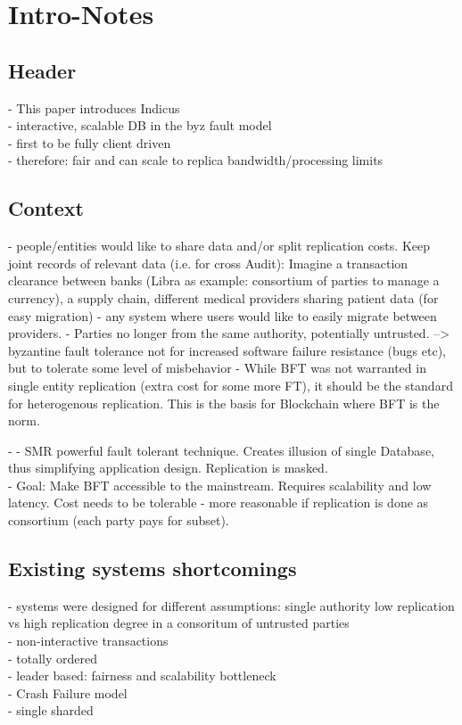 \section{Intro-Notes}

\subsection{Header}

 - This paper introduces Indicus\\
 - interactive, scalable DB in the byz fault model\\
 - first to be fully client driven\\
 - therefore: fair and can scale to replica bandwidth/processing limits
 
 \subsection{Context}
 - people/entities would like to share data and/or split replication costs. Keep joint records of relevant data (i.e. for cross Audit): Imagine a transaction clearance between banks  (Libra as example: consortium of parties to manage a currency), a supply chain, different medical providers sharing patient data (for easy migration) - any system where users would like to easily migrate between providers.
 - Parties no longer from the same authority, potentially untrusted. --> byzantine fault tolerance not for increased software failure resistance (bugs etc), but to tolerate some level of misbehavior
 - While BFT was not warranted in single entity replication (extra cost for some more FT), it should be the standard for heterogenous replication. This is the basis for Blockchain where BFT is the norm.
 
 -
 - SMR powerful fault tolerant technique. Creates illusion of single Database, thus simplifying application design. Replication is masked.\\
 
 
 - Goal: Make BFT accessible to the mainstream. Requires scalability and low latency. Cost needs to be tolerable - more reasonable if replication is done as consortium (each party pays for subset).
 

\subsection{Existing systems shortcomings}
- systems were designed for different assumptions: single authority low replication vs high replication degree in a consoritum of untrusted parties\\
- non-interactive transactions\\
- totally ordered\\
- leader based: fairness and scalability bottleneck \\
- Crash Failure model\\
- single sharded\\

